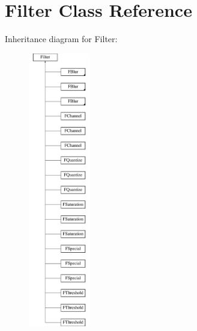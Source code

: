 \hypertarget{classFilter}{\section{Filter Class Reference}
\label{classFilter}
}
Inheritance diagram for Filter\-:\begin{figure}[H]
\begin{center}
\leavevmode
\includegraphics[height=12.000000cm]{classFilter}
\end{center}
\end{figure}
